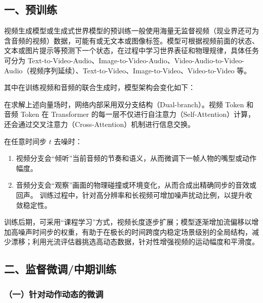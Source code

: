 \hypertarget{ux4e00ux9884ux8badux7ec3}{%
\subsection{一、预训练}\label{ux4e00ux9884ux8badux7ec3}}

视频生成模型或生成式世界模型的预训练一般使用海量无监督视频（现业界还可为含音频的视频）数据，可能有或无文本或图像标签。模型可根据视频前面的状态、文本或图片提示等预测下一个状态，在过程中学习世界表征和物理规律，具体任务可分为 Text-to-Video-Audio、Image-to-Video-Audio、Video-Audio-to-Video-Audio（视频序列延续）、Text-to-Video、Image-to-Video、Video-to-Video 等。

其中在训练视频和音频的联合生成时，模型架构会变化如下：

在求解上述向量场时，网络内部采用双分支结构（Dual-branch）。视频 Token 和音频 Token 在 Transformer 的每一层不仅进行自注意力（Self-Attention）计算，还会通过交叉注意力（Cross-Attention）机制进行信息交换。

在任意时间步 \(t\) 去噪时：

\begin{enumerate}
\def\labelenumi{\arabic{enumi}.}
\item
  视频分支会``倾听''当前音频的节奏和语义，从而微调下一帧人物的嘴型或动作幅度。
\item
  音频分支会``观察''画面的物理碰撞或环境变化，从而合成出精确同步的音效或回声。
  训练过程中，针对高分辨率和长视频可增加噪声扰动比例，以提升收敛稳定性。
\end{enumerate}

训练后期，可采用``课程学习''方式，视频长度逐步扩展；模型逐渐增加流偏移以增加高噪声时间步的权重，有助于在极长的时间跨度内稳定场景级别的全局结构，减少漂移；利用光流评估器挑选高动态数据，针对性增强视频的运动幅度和平滑度。

\hypertarget{ux4e8cux76d1ux7763ux5faeux8c03ux4e2dux671fux8badux7ec3}{%
\subsection{二、监督微调/中期训练}\label{ux4e8cux76d1ux7763ux5faeux8c03ux4e2dux671fux8badux7ec3}}

\hypertarget{ux4e00ux9488ux5bf9ux52a8ux4f5cux52a8ux6001ux7684ux5faeux8c03}{%
\subsubsection{（一）针对动作动态的微调}\label{ux4e00ux9488ux5bf9ux52a8ux4f5cux52a8ux6001ux7684ux5faeux8c03}}


